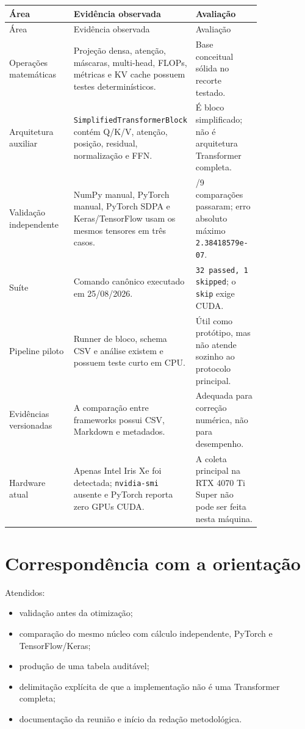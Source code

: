 \begin{longtable}{@{}>{\RaggedRight\arraybackslash}p{0.273\linewidth}>{\RaggedRight\arraybackslash}p{0.273\linewidth}>{\RaggedRight\arraybackslash}p{0.273\linewidth}@{}}
\toprule
Área & Evidência observada & Avaliação \\
\midrule
\endfirsthead
\toprule
Área & Evidência observada & Avaliação \\
\midrule
\endhead
Operações matemáticas & Projeção densa, atenção, máscaras, multi-head, FLOPs, métricas e KV cache possuem testes determinísticos. & Base conceitual sólida no recorte testado. \\
Arquitetura auxiliar & \texttt{Simplified\allowbreak{}Transformer\allowbreak{}Block} contém Q/K/V, atenção, posição, residual, normalização e FFN. & É bloco simplificado; não é arquitetura Transformer completa. \\
Validação independente & NumPy manual, PyTorch manual, PyTorch SDPA e Keras/TensorFlow usam os mesmos tensores em três casos. & 9/9 comparações passaram; erro absoluto máximo \texttt{2.\allowbreak{}38418579e-07}. \\
Suíte & Comando canônico executado em 25/08/2026. & \texttt{32 passed, 1 skipped}; o \texttt{skip} exige CUDA. \\
Pipeline piloto & Runner de bloco, schema CSV e análise existem e possuem teste curto em CPU. & Útil como protótipo, mas não atende sozinho ao protocolo principal. \\
Evidências versionadas & A comparação entre frameworks possui CSV, Markdown e metadados. & Adequada para correção numérica, não para desempenho. \\
Hardware atual & Apenas Intel Iris Xe foi detectada; \texttt{nvidia-smi} ausente e PyTorch reporta zero GPUs CUDA. & A coleta principal na RTX 4070 Ti Super não pode ser feita nesta máquina. \\
\bottomrule
\end{longtable}



\section{Correspondência com a orientação}



Atendidos:


\begin{itemize}
\item validação antes da otimização;
\item comparação do mesmo núcleo com cálculo independente, PyTorch e
TensorFlow/Keras;
\item produção de uma tabela auditável;
\item delimitação explícita de que a implementação não é uma Transformer completa;
\item documentação da reunião e início da redação metodológica.
\end{itemize}



